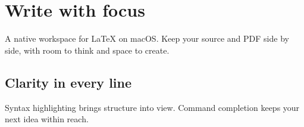 \section{Write with focus}
\label{sec:writing}
A native workspace for LaTeX on macOS.
Keep your source and PDF side by side,
with room to think and space to create.

\subsection{Clarity in every line}
Syntax highlighting brings structure
into view. Command completion keeps
your next idea within reach.

